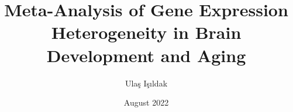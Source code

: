 \documentclass[chaparabic,biol,ms,12pt,oneandhalf,threejury]{metu}
\author{Ulaş Işıldak}
\title{Meta-Analysis of Gene Expression Heterogeneity in Brain Development and Aging}
\date{August 2022}
\begin{document}
\begin{preliminaries}


\end{preliminaries}
%   
% 
%

\setlength{\parindent}{0em}
\setlength{\parskip}{10pt}







%
%  




\appendices






\end{document}
